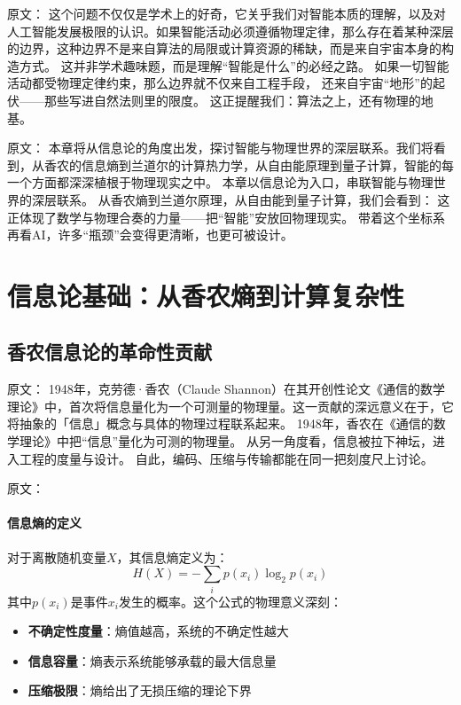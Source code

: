 原文：
这个问题不仅仅是学术上的好奇，它关乎我们对智能本质的理解，以及对人工智能发展极限的认识。如果智能活动必须遵循物理定律，那么存在着某种深层的边界，这种边界不是来自算法的局限或计算资源的稀缺，而是来自宇宙本身的构造方式。
这并非学术趣味题，而是理解“智能是什么”的必经之路。  
如果一切智能活动都受物理定律约束，那么边界就不仅来自工程手段，  
还来自宇宙“地形”的起伏——\;那些写进自然法则里的限度。  
这正提醒我们：算法之上，还有物理的地基。

原文：
本章将从信息论的角度出发，探讨智能与物理世界的深层联系。我们将看到，从香农的信息熵到兰道尔的计算热力学，从自由能原理到量子计算，智能的每一个方面都深深植根于物理现实之中。
本章以信息论为入口，串联智能与物理世界的深层联系。  
从香农熵到兰道尔原理，从自由能到量子计算，我们会看到：  
这正体现了数学与物理合奏的力量——把“智能”安放回物理现实。  
带着这个坐标系再看AI，许多“瓶颈”会变得更清晰，也更可被设计。

\section{信息论基础：从香农熵到计算复杂性}

\subsection{香农信息论的革命性贡献}

原文：
1948年，克劳德·香农（Claude Shannon）在其开创性论文《通信的数学理论》中，首次将信息量化为一个可测量的物理量。这一贡献的深远意义在于，它将抽象的「信息」概念与具体的物理过程联系起来。
1948年，香农在《通信的数学理论》中把“信息”量化为可测的物理量。  
从另一角度看，信息被拉下神坛，进入工程的度量与设计。  
自此，编码、压缩与传输都能在同一把刻度尺上讨论。

原文：
\paragraph{信息熵的定义}
对于离散随机变量$X$，其信息熵定义为：
$$H(X) = -\sum_{i} p(x_i) \log_2 p(x_i)$$
其中$p(x_i)$是事件$x_i$发生的概率。这个公式的物理意义深刻：
\begin{itemize}
\item \textbf{不确定性度量}：熵值越高，系统的不确定性越大
\item \textbf{信息容量}：熵表示系统能够承载的最大信息量
\item \textbf{压缩极限}：熵给出了无损压缩的理论下界
\end{itemize}
